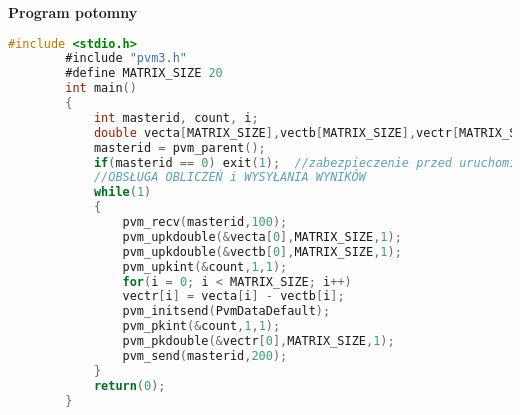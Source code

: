 		\newpage
		\textbf{Program potomny}
		\begin{lstlisting}[language=C]
		#include <stdio.h>
		#include "pvm3.h"
		#define MATRIX_SIZE 20
		int main()
		{
			int masterid, count, i;
			double vecta[MATRIX_SIZE],vectb[MATRIX_SIZE],vectr[MATRIX_SIZE];
			masterid = pvm_parent();
			if(masterid == 0) exit(1);	//zabezpieczenie przed uruchomieniem z poziomu rodzica
			//OBSŁUGA OBLICZEŃ i WYSYŁANIA WYNIKÓW
			while(1)
			{
				pvm_recv(masterid,100);
				pvm_upkdouble(&vecta[0],MATRIX_SIZE,1);
				pvm_upkdouble(&vectb[0],MATRIX_SIZE,1);
				pvm_upkint(&count,1,1);
				for(i = 0; i < MATRIX_SIZE; i++)
				vectr[i] = vecta[i] - vectb[i];
				pvm_initsend(PvmDataDefault);
				pvm_pkint(&count,1,1);
				pvm_pkdouble(&vectr[0],MATRIX_SIZE,1);
				pvm_send(masterid,200);		
			}
			return(0);
		}
		\end{lstlisting}
			
		\newpage
